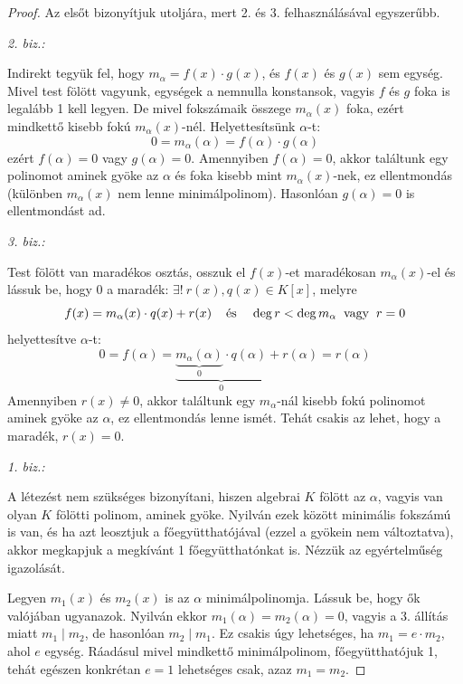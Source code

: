 \documentclass[12pt]{book}
\theoremstyle{plain} %
\theoremstyle{definition} %
\theoremstyle{remark}
\numberwithin{equation}{section}  %
\begin{document}
	\begin{proof}
		Az elsőt bizonyítjuk utoljára, mert 2. és 3. felhasználásával egyszerűbb.
		
		\textit{2. biz.:}
		
		Indirekt tegyük fel, hogy $m_\alpha = f(x)\cdot g(x)$, és $f(x)$ és $g(x)$ sem egység. Mivel test fölött vagyunk, egységek a nemnulla konstansok, vagyis $f$ és $g$ foka is legalább 1 kell legyen. De mivel fokszámaik összege $m_\alpha(x)$ foka, ezért mindkettő kisebb fokú $m_\alpha(x)$-nél. Helyettesítsünk $\alpha$-t:
		\[ 0 = m_\alpha(\alpha) = f(\alpha) \cdot g(\alpha)  \]
		ezért $f(\alpha)=0$ vagy $g(\alpha)=0$. Amennyiben $f(\alpha)=0$, akkor találtunk egy polinomot aminek gyöke az $\alpha$ és foka kisebb mint $m_\alpha(x)$-nek, ez ellentmondás (különben $m_\alpha(x)$ nem lenne minimálpolinom). Hasonlóan $g(\alpha)=0$ is ellentmondást ad.
		
		\textit{3. biz.:}
		
		Test fölött van maradékos osztás, osszuk el $f(x)$-et maradékosan $m_\alpha(x)$-el és lássuk be, hogy $0$ a maradék: $\exists!\ r(x),q(x)\in K[x]$, melyre
		\[ f(x) = m_\alpha(x) \cdot q(x) + r(x) \hspace{4mm} \text{és} \hspace{4mm} \deg r < \deg m_\alpha \hspace{2mm} \text{vagy} \hspace{2mm} r=0  \]
		helyettesítve $\alpha$-t:
		\[ 0 = f(\alpha) = \underbrace{\underbrace{m_\alpha(\alpha)}_{0}\cdot q(\alpha)}_{0} + r(\alpha) = r(\alpha) \]
		Amennyiben $r(x)\neq 0$, akkor találtunk egy $m_\alpha$-nál kisebb fokú polinomot aminek gyöke az $\alpha$, ez ellentmondás lenne ismét. Tehát csakis az lehet, hogy a maradék, $r(x)=0$.
		
		\textit{1. biz.:}
		
		A létezést nem szükséges bizonyítani, hiszen algebrai $K$ fölött az $\alpha$, vagyis van olyan $K$ fölötti polinom, aminek gyöke. Nyilván ezek között minimális fokszámú is van, és ha azt leosztjuk a főegyütthatójával (ezzel a gyökein nem változtatva), akkor megkapjuk a megkívánt 1 főegyütthatónkat is. Nézzük az egyértelműség igazolását.
		
		Legyen $m_1(x)$ és $m_2(x)$	is az $\alpha$ minimálpolinomja. Lássuk be, hogy ők valójában ugyanazok. Nyilván ekkor $m_1(\alpha)=m_2(\alpha)=0$, vagyis a 3. állítás miatt $m_1 \mid m_2$, de hasonlóan $m_2\mid m_1$. Ez csakis úgy lehetséges, ha $m_1 = e\cdot m_2$, ahol $e$ egység. Ráadásul mivel mindkettő minimálpolinom, főegyütthatójuk 1, tehát egészen konkrétan $e=1$ lehetséges csak, azaz $m_1 = m_2$.	
	\end{proof}
	
\end{document}
